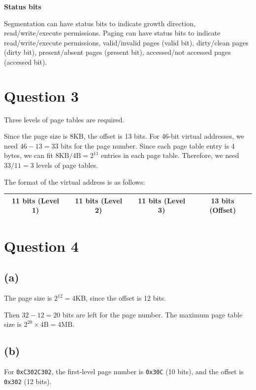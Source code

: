 \documentclass[a4paper,12pt]{article}
\begin{document}
\textbf{Status bits}
\begin{paracol}{2}
Segmentation can have status bits to indicate growth direction, read/write/execute permissions.
\switchcolumn
Paging can have status bits to indicate read/write/execute permissions, valid/invalid pages (valid bit), dirty/clean pages (dirty bit), present/absent pages (present bit), accessed/not accessed pages (accessed bit).
\end{paracol}

\section*{Question 3}

Three levels of page tables are required.

Since the page size is 8KB, the offset is 13 bits. For 46-bit virtual addresses, we need $46 - 13 = 33$ bits for the page number. Since each page table entry is 4 bytes, we can fit $8 \text{KB} / 4 \text{B} = 2^{11}$ entries in each page table. Therefore, we need $33 / 11 = 3$ levels of page tables.

The format of the virtual address is as follows:
\begin{table}[H]
	\centering
	\begin{tabular}{|c|c|c|c|}
		\hline
		11 bits (Level 1) & 11 bits (Level 2) & 11 bits (Level 3) & 13 bits (Offset) \\
		\hline
	\end{tabular}
\end{table}

\section*{Question 4}

\subsection*{(a)}

The page size is $2^{12} = 4 \text{KB}$, since the offset is 12 bits.

Then $32 - 12 = 20$ bits are left for the page number. The maximum page table size is $2^{20} \times 4 \text{B} = 4 \text{MB}$.

\subsection*{(b)}

For \texttt{0xC302C302}, the first-level page number is \texttt{0x30C} (10 bits), and the offset is \texttt{0x302} (12 bits).
\end{document}
